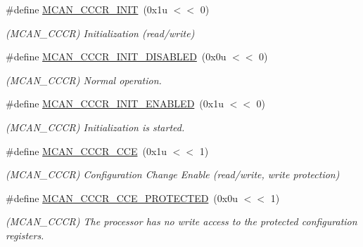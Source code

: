 \begin{DoxyCompactItemize}
\#define \mbox{\hyperlink{group__SAMV71__MCAN_ga2d679ba6d4d15b01aae325f11eb9195c}{M\+C\+A\+N\+\_\+\+C\+C\+C\+R\+\_\+\+I\+N\+IT}}~(0x1u $<$$<$ 0)
\begin{DoxyCompactList}\small\item\em (M\+C\+A\+N\+\_\+\+C\+C\+CR) Initialization (read/write) \end{DoxyCompactList}\item 
\mbox{\label{group__SAMV71__MCAN_ga7ce474e5e7280616baeb266f7d2c509e}} 
\#define \mbox{\hyperlink{group__SAMV71__MCAN_ga7ce474e5e7280616baeb266f7d2c509e}{M\+C\+A\+N\+\_\+\+C\+C\+C\+R\+\_\+\+I\+N\+I\+T\+\_\+\+D\+I\+S\+A\+B\+L\+ED}}~(0x0u $<$$<$ 0)
\begin{DoxyCompactList}\small\item\em (M\+C\+A\+N\+\_\+\+C\+C\+CR) Normal operation. \end{DoxyCompactList}\item 
\mbox{\label{group__SAMV71__MCAN_ga63ed4bcfe6dc608c496bb749463784e9}} 
\#define \mbox{\hyperlink{group__SAMV71__MCAN_ga63ed4bcfe6dc608c496bb749463784e9}{M\+C\+A\+N\+\_\+\+C\+C\+C\+R\+\_\+\+I\+N\+I\+T\+\_\+\+E\+N\+A\+B\+L\+ED}}~(0x1u $<$$<$ 0)
\begin{DoxyCompactList}\small\item\em (M\+C\+A\+N\+\_\+\+C\+C\+CR) Initialization is started. \end{DoxyCompactList}\item 
\mbox{\label{group__SAMV71__MCAN_ga388e2f8b2a58736e39b84c8a604f93a0}} 
\#define \mbox{\hyperlink{group__SAMV71__MCAN_ga388e2f8b2a58736e39b84c8a604f93a0}{M\+C\+A\+N\+\_\+\+C\+C\+C\+R\+\_\+\+C\+CE}}~(0x1u $<$$<$ 1)
\begin{DoxyCompactList}\small\item\em (M\+C\+A\+N\+\_\+\+C\+C\+CR) Configuration Change Enable (read/write, write protection) \end{DoxyCompactList}\item 
\mbox{\label{group__SAMV71__MCAN_gade60314f6ce3432a6cf5831584690675}} 
\#define \mbox{\hyperlink{group__SAMV71__MCAN_gade60314f6ce3432a6cf5831584690675}{M\+C\+A\+N\+\_\+\+C\+C\+C\+R\+\_\+\+C\+C\+E\+\_\+\+P\+R\+O\+T\+E\+C\+T\+ED}}~(0x0u $<$$<$ 1)
\begin{DoxyCompactList}\small\item\em (M\+C\+A\+N\+\_\+\+C\+C\+CR) The processor has no write access to the protected configuration registers. \end{DoxyCompactList}\item 
$$
\end{DoxyCompactItemize}
